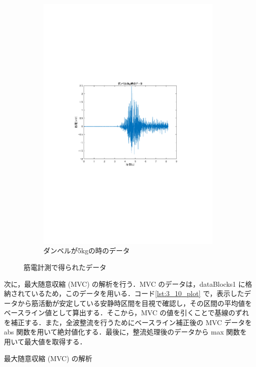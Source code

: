 \documentclass[dvipdfmx, titlepage, t]{jsarticle}
\begin{document}
\begin{figure}[H]
\begin{subfigure}[b]{0.48\linewidth}
        \includegraphics[trim=90 250 100 250 clip,width=\linewidth]{figure/data_5kg.pdf}
        \caption{ダンベルが5kgの時のデータ} %
        \label{fig:subd}
    \end{subfigure}

    \caption{筋電計測で得られたデータ} %
    \label{fig:all_four_images}
\end{figure}

    次に，最大随意収縮 (MVC) の解析を行う．MVC のデータは，dataBlocks{1} に格納されているため，このデータを用いる．コード\ref{lst:3_10_plot} で，表示したデータから筋活動が安定している安静時区間を目視で確認し，その区間の平均値をベースライン値として算出する．そこから，MVC の値を引くことで基線のずれを補正する．また，全波整流を行うためにベースライン補正後の MVC データを abs 関数を用いて絶対値化する．最後に，整流処理後のデータから max 関数を用いて最大値を取得する．
    \begin{program}[H]
        \caption{最大随意収縮 (MVC) の解析}
        \inputminted[linenos,
        firstline=31,
        lastline=50,
        frame=lines,
        fontsize = \small]{matlab}{code/Exp3_10_Matlab.m}
        \label{lst:3_10_mvc}
    \end{program}
\end{document}
